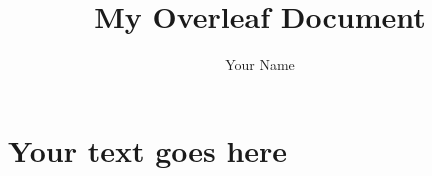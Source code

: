\documentclass[12pt]{article}
\begin{document}
 

\title{My Overleaf Document}
\author{Your Name}
\date{}

\maketitle

\section*{Your text goes here}

\end{document}
